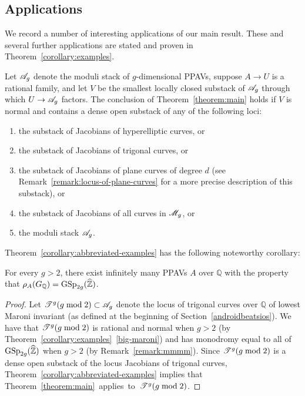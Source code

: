 \subsection{Applications} We record a number of interesting applications of our main result. These and several further applications are stated and proven in
Theorem~\ref{corollary:examples}.
\begin{theorem}
	\label{corollary:abbreviated-examples}
	Let ${\mathscr A_g}$ denote the moduli stack of $g$-dimensional PPAVs, suppose $A \to U$ is a rational family, and let $V$ be
	the smallest locally closed substack of ${\mathscr A_g}$ through which $U \rightarrow {\mathscr A_g}$ factors.
	The conclusion of Theorem~\ref{theorem:main} holds if $V$ is normal and contains a dense open substack of any of the following loci:
	\begin{enumerate}
		\item the substack of Jacobians of hyperelliptic curves, or
		\item the substack of Jacobians of trigonal curves, or
		\item the substack of Jacobians of plane curves of degree $d$ (see Remark~\ref{remark:locus-of-plane-curves} for a more precise description of this substack), or
		\item the substack of Jacobians of all curves in ${\mathscr M_g}$, or
		\item the moduli stack ${\mathscr A_g}$.
	\end{enumerate}
\end{theorem}
Theorem~\ref{corollary:abbreviated-examples} has the following noteworthy corollary:

\begin{corollary}
	\label{corollary:infinitely-many-maximal-image}
	For every $g > 2$, there exist infinitely many PPAVs $A$ over $\mathbb Q$
	with the property that $\rho_A(G_\mathbb Q) = \operatorname{GSp}_{2g}(\widehat{\mathbb Z})$.
\end{corollary}
\begin{proof}
Let $\mathscr T^{g}(g\bmod 2) \subset {\mathscr A_g}$ denote the locus of trigonal curves over $\mathbb Q$ of lowest Maroni invariant
(as defined at the beginning of Section~\ref{androidbeatsios}).
We have that $\mathscr T^{g}(g\bmod 2)$ is rational and normal when $g > 2$ (by
Theorem~\ref{corollary:examples}~\ref{big-maroni}) and has monodromy equal to all of $\operatorname{GSp}_{2g}(\widehat{\mathbb Z})$
when $g > 2$
(by Remark~\ref{remark:mmmm}).
Since $\mathscr T^{g}(g\bmod 2)$ is a dense open substack of the
locus Jacobians of trigonal curves, Theorem~\ref{corollary:abbreviated-examples}
implies that \mbox{Theorem~\ref{theorem:main}
applies to $\mathscr T^{g}(g\bmod 2)$.\qedhere}
\end{proof}

